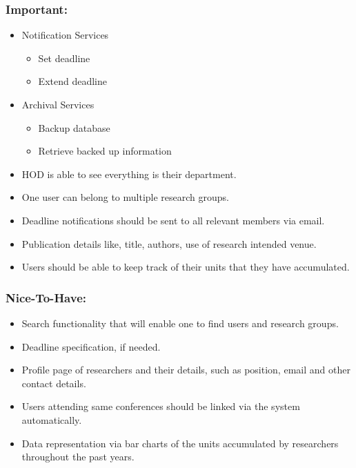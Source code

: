 \documentclass[11pt]{article}
\begin{document}
	\subsubsection{Important:}
	\begin{itemize}
		\item Notification Services
		\begin{itemize}
			\item Set deadline
			\item Extend deadline
		\end{itemize}
		\item Archival Services
		\begin{itemize}
			\item Backup  database
			\item Retrieve backed up information
		\end{itemize}
	\end{itemize}
	\begin{itemize}
		\item HOD is able to see everything is their department.
		\item One user can belong to multiple research groups.
		\item Deadline notifications should be sent to all relevant members via email.
		\item Publication details like, title, authors, use of research intended venue.
		\item Users should be able to keep track of their units that they have accumulated.
	\end{itemize}
	
	\subsubsection{Nice-To-Have:}
	\begin{itemize}
		\item Search functionality that will enable one to find users and research groups.
		\item Deadline specification, if needed.
		\item Profile page of researchers and their details, such as position, email and other contact details.
		\item Users attending same conferences should be linked via the system automatically.
		\item Data representation via bar charts of the units accumulated by researchers throughout the past years.
	\end{itemize}
	
\end{document}

